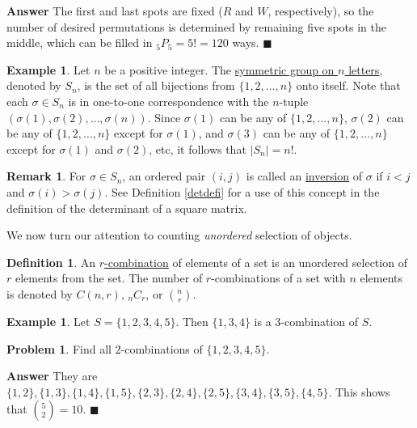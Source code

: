 \documentclass[12pt,letterpaper]{book}
\numberwithin{equation}{section}
\theoremstyle{definition}
\newtheorem{defi}[thm]{\textbf{Definition}}
\newtheorem{problem}[thm]{\textbf{Problem}}
\newtheorem{example}[thm]{\textbf{Example}}
\newtheorem{remark}[thm]{\textbf{Remark}}
\newenvironment{answer}{\noindent\textbf{Answer}}{\hfill$\blacksquare$\vspace{0.1in}}
\begin{document}
\begin{answer}
The first and last spots are fixed ($R$ and $W$, respectively), so the number of desired permutations is determined by remaining five spots in the middle, which can be filled in $_5P_5=5!=120$ ways.
\end{answer}

\begin{example}
Let $n$ be a positive integer. The \underline{symmetric group on $n$ letters}, denoted by $S_n$, is the set of all bijections from $\{1,2,\ldots,n\}$ onto itself. Note that each $\sigma\in S_n$ is in one-to-one correspondence with the $n$-tuple $(\sigma(1),\sigma(2),\ldots,\sigma(n))$. Since $\sigma(1)$ can be any of $\{1,2,\ldots,n\}$, $\sigma(2)$  can be any of $\{1,2,\ldots,n\}$ except for $\sigma(1)$, and $\sigma(3)$  can be any of $\{1,2,\ldots,n\}$ except for $\sigma(1)$ and $\sigma(2)$, etc, it follows that $|S_n|=n!$.
\end{example}

\begin{remark} \label{Sndef}
For $\sigma\in S_n$, an ordered pair $(i,j)$ is called an \underline{inversion} of $\sigma$ if $i<j$ and $\sigma(i)>\sigma(j)$. See Definition \ref{detdefi} for a use of this concept in the definition of the determinant of a square matrix.
\end{remark}

We now turn our attention to counting \textit{unordered} selection of objects.

\begin{defi} An \underline{$r$-combination} of elements of a set is an unordered selection of $r$ elements from the set. The number of $r$-combinations of a set with $n$ elements is denoted by $C(n,r)$, $_nC_r$, or $n\choose r$.
\end{defi}

\begin{example} Let $S=\{1,2,3,4,5\}$. Then $\{1,3,4\}$ is a $3$-combination of $S$.
\end{example}

\begin{problem}\label{fourc2list}
Find all $2$-combinations of $\{1,2,3,4,5\}$.
\end{problem}

\begin{answer}
They are $\{1,2\},\{1,3\},\{1,4\},\{1,5\},\{2,3\},\{2,4\},\{2,5\},\{3,4\},\{3,5\},\{4,5\}$. This shows that ${5\choose 2}=10$.
\end{answer}
\end{document}
